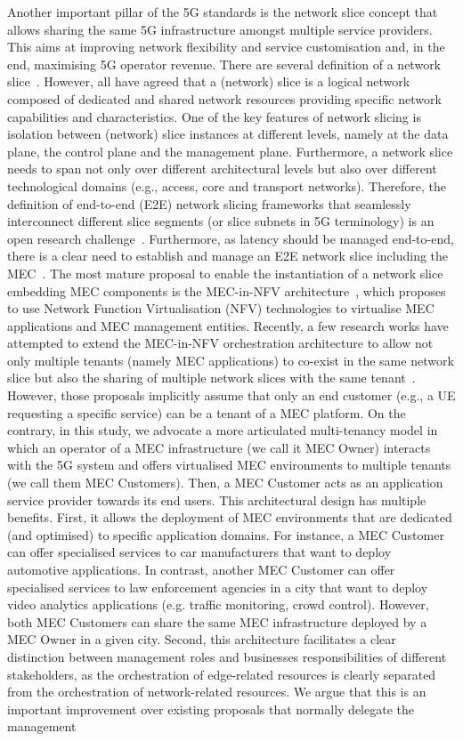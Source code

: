 Another important pillar of the 5G standards is the network slice concept that allows sharing the same 5G infrastructure amongst multiple service providers. This aims at improving network flexibility and service customisation and, in the end, maximising 5G operator revenue. There are several definition of a network slice~\cite{NFV028,NFV012,NGMN028,3GPPTR28801,IETFFarrel}. However, all have agreed that a (network) slice is a logical network composed of dedicated and shared network resources providing specific network capabilities and characteristics. One of the key features of network slicing is isolation between (network) slice instances at different levels, namely at the data plane, the control plane and the management plane. Furthermore, a network slice needs to span not only over different architectural levels but also over different technological domains (e.g., access, core and transport networks). Therefore, the definition of end-to-end (E2E) network slicing frameworks that seamlessly interconnect different slice segments (or slice subnets in 5G terminology) is an open research challenge~\cite{ZSM003}. Furthermore, as latency should be managed end-to-end, there is a clear need to establish and manage an E2E network slice including the MEC~\cite{MEC024}. The most mature proposal to enable the instantiation of a network slice embedding MEC components is the MEC-in-NFV architecture~\cite{MEC003}, which proposes to use Network Function Virtualisation (NFV) technologies to virtualise MEC applications and MEC management entities. Recently, a few research works have attempted to extend the MEC-in-NFV orchestration architecture to allow not only multiple tenants (namely MEC applications) to co-exist in the same network slice but also the sharing of multiple network slices with the same tenant~\cite{Cominardi2020,2020_MNET_MEC_subslice}. However, those proposals implicitly assume that only an end customer (e.g., a UE requesting a specific service) can be a tenant of a MEC platform. On the contrary, in this study, we advocate a more articulated multi-tenancy model in which an operator of a MEC infrastructure (we call it MEC Owner) interacts with the 5G system and offers virtualised MEC environments to multiple tenants (we call them MEC Customers). Then, a MEC Customer acts as an application service provider towards its end users. This architectural design has multiple benefits. First, it allows the deployment of MEC environments that are dedicated (and optimised) to specific application domains. For instance, a MEC Customer can offer specialised services to car manufacturers that want to deploy automotive applications. In contrast, another MEC Customer can offer specialised services to law enforcement agencies in a city that want to deploy video analytics applications (e.g. traffic monitoring, crowd control). However, both MEC Customers can share the same MEC infrastructure deployed by a MEC Owner in a given city. Second, this architecture facilitates a clear distinction between management roles and businesses responsibilities of different stakeholders, as the orchestration of edge-related resources is clearly separated from the orchestration of network-related resources. We argue that this is an important improvement over existing proposals that normally delegate the management 